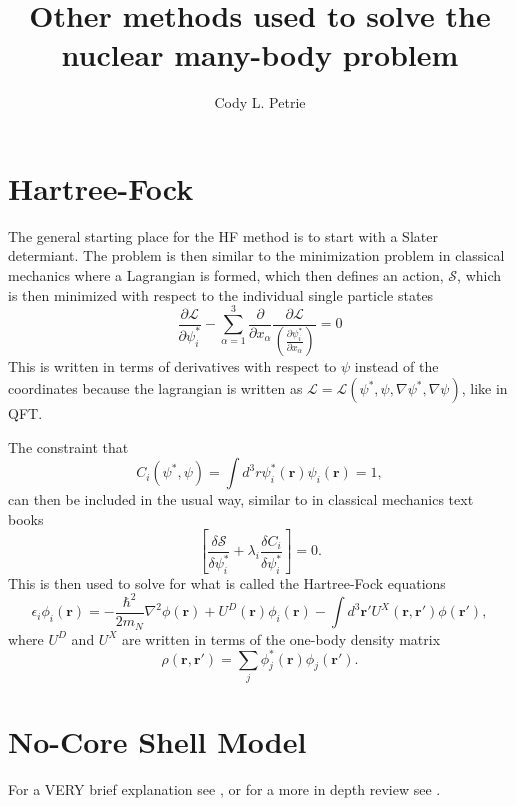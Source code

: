 \documentclass[12pt]{extarticle}
\title{Other methods used to solve the nuclear many-body problem}
\author{Cody L. Petrie}
\begin{document}
\maketitle

\section{Hartree-Fock}
The general starting place for the HF method is to start with a Slater determiant. The problem is then similar to the minimization problem in classical mechanics where a Lagrangian is formed, which then defines an action, $\mathcal{S}$, which is then minimized with respect to the individual single particle states
\begin{equation}
   \frac{\partial\mathcal{L}}{\partial \psi^*_i} - \sum\limits_{\alpha=1}^3 \frac{\partial}{\partial x_\alpha} \frac{\partial \mathcal{L}}{\left(\frac{\partial\psi^*_i}{\partial x_\alpha}\right)} = 0
\end{equation}
This is written in terms of derivatives with respect to $\psi$ instead of the coordinates because the lagrangian is written as $\mathcal{L} = \mathcal{L}(\psi^*,\psi,\nabla\psi^*,\nabla\psi)$, like in QFT.

The constraint that
\begin{equation}
   C_i(\psi^*,\psi) = \int d^3r \psi^*_i(\mathbf{r})\psi_i(\mathbf{r}) = 1,
\end{equation}
can then be included in the usual way, similar to in classical mechanics text books
\begin{equation}
   \left[\frac{\delta\mathcal{S}}{\delta \psi^*_i} + \lambda_i\frac{\delta C_i}{\delta\psi^*_i}\right] = 0.
\end{equation}
This is then used to solve for what is called the Hartree-Fock equations
\begin{equation}
   \epsilon_i\phi_i(\mathbf{r}) = -\frac{\hbar^2}{2m_N}\nabla^2\phi(\mathbf{r}) + U^D(\mathbf{r})\phi_i(\mathbf{r}) - \int d^3\mathbf{r}'U^X(\mathbf{r},\mathbf{r}')\phi(\mathbf{r}'),
\end{equation}
where $U^D$ and $U^X$ are written in terms of the one-body density matrix
\begin{equation}
   \rho(\mathbf{r},\mathbf{r}') = \sum\limits_j \phi^*_j(\mathbf{r})\phi_j(\mathbf{r}').
\end{equation}

\section{No-Core Shell Model}
For a VERY brief explanation see \cite{lynn2013}, or for a more in depth review see \cite{navratil2009}.
\end{document}
